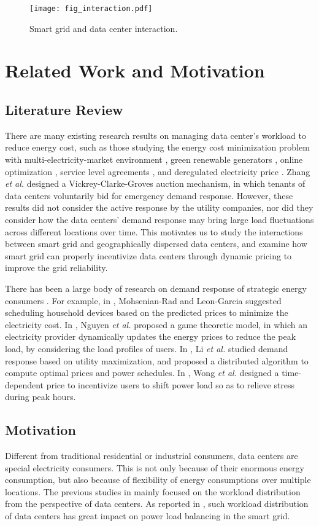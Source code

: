 \documentclass[journal]{IEEEtran}
\begin{document}
	\begin{figure}[t]
		\centering
		\texttt{[image: fig\_interaction.pdf]}
		\caption{\label{fig_interaction}Smart grid and data center interaction.}
\end{figure}
	
	\section{Related Work and Motivation}
	\subsection{Literature Review}
	There are many existing research results on managing data center's workload to reduce energy cost, such as those studying the energy cost minimization problem with multi-electricity-market environment \cite{infocom}, green renewable generators \cite{sigmetrics}, online optimization \cite{online}, service level agreements \cite{SLA}, and deregulated electricity price \cite{price}. Zhang \textit{et al.} \cite{Auction} designed a Vickrey-Clarke-Groves auction mechanism, in which tenants of data centers voluntarily bid for emergency demand response. However, these results did not consider the active response by the utility companies, nor did they consider how the data centers' demand response may bring large load fluctuations across different locations over time. This motivates us to study the interactions between smart grid and geographically dispersed data centers, and examine how smart grid can properly incentivize data centers through dynamic pricing to improve the grid reliability.
	
	There has been a large body of research on demand response of strategic energy consumers \cite{hamed1,han,lina,mung}. For example, in \cite{hamed1}, Mohsenian-Rad and Leon-Garcia suggested scheduling household devices based on the predicted prices to minimize the electricity cost. In \cite{han}, Nguyen \textit{et al.} proposed a game theoretic model, in which an electricity provider dynamically updates the energy prices to reduce the peak load, by considering the load profiles of users. In \cite{lina}, Li \textit{et al.} studied demand response based on utility maximization, and proposed a distributed algorithm to compute optimal prices and power schedules. In \cite{mung}, Wong \textit{et al.} designed a time-dependent price to incentivize users to shift power load so as to relieve stress during peak hours. 
	
	\subsection{Motivation}
	Different from traditional residential or industrial consumers, data centers are special electricity consumers. This is not only because of their enormous energy consumption, but also because of flexibility of energy consumptions over multiple locations. The previous studies in \cite{infocom,sigmetrics,online,SLA,price,Auction} mainly focused on the workload distribution from the perspective of data centers. As reported in \cite{tradeoff}, such workload distribution of data centers has great impact on power load balancing in the smart grid. 
		
\end{document}
